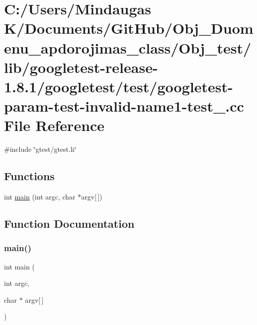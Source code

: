 \hypertarget{_obj__test_2lib_2googletest-release-1_88_81_2googletest_2test_2googletest-param-test-invalid-name1-test___8cc}{}\section{C\+:/\+Users/\+Mindaugas K/\+Documents/\+Git\+Hub/\+Obj\+\_\+\+Duomenu\+\_\+apdorojimas\+\_\+class/\+Obj\+\_\+test/lib/googletest-\/release-\/1.8.1/googletest/test/googletest-\/param-\/test-\/invalid-\/name1-\/test\+\_\+.cc File Reference}
\label{_obj__test_2lib_2googletest-release-1_88_81_2googletest_2test_2googletest-param-test-invalid-name1-test___8cc}
{\ttfamily \#include \char`\"{}gtest/gtest.\+h\char`\"{}}\newline
\subsection*{Functions}
\begin{DoxyCompactItemize}
\item 
int \mbox{\hyperlink{_obj__test_2lib_2googletest-release-1_88_81_2googletest_2test_2googletest-param-test-invalid-name1-test___8cc_a0ddf1224851353fc92bfbff6f499fa97}{main}} (int argc, char $\ast$argv\mbox{[}$\,$\mbox{]})
\end{DoxyCompactItemize}


\subsection{Function Documentation}
\mbox{\label{_obj__test_2lib_2googletest-release-1_88_81_2googletest_2test_2googletest-param-test-invalid-name1-test___8cc_a0ddf1224851353fc92bfbff6f499fa97}} 
\subsubsection{\texorpdfstring{main()}{main()}}
{\footnotesize\ttfamily int main (\begin{DoxyParamCaption}\item[{int}]{argc,  }\item[{char $\ast$}]{argv\mbox{[}$\,$\mbox{]} }\end{DoxyParamCaption})}

